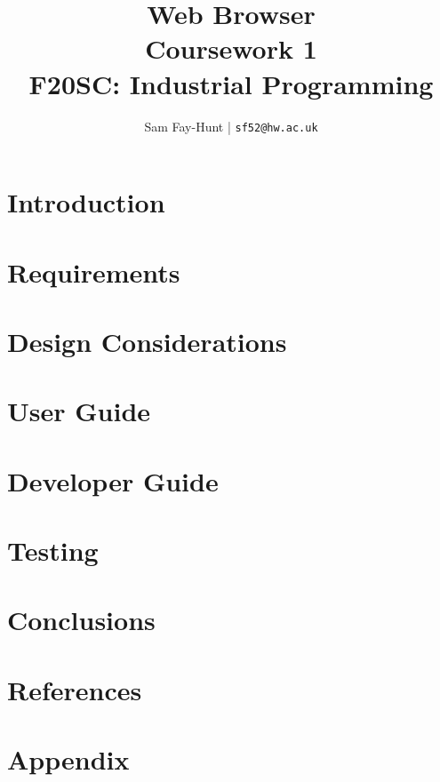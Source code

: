\documentclass[11pt]{article}
\begin{document}
\title{%
	\bf Web Browser\\ 
	\large Coursework 1 \\
	F20SC: Industrial Programming}

\author{
	Sam Fay-Hunt | \texttt{sf52@hw.ac.uk}
}

\maketitle
\thispagestyle{empty}
\pagebreak


\tableofcontents
\thispagestyle{empty}
\pagebreak


\setcounter{page}{1}

\section{Introduction}


\section{Requirements}


\section{Design Considerations}



\section{User Guide}


\section{Developer Guide}


\section{Testing}


\section{Conclusions}


\section{References}
\printbibliography

\appendix
\section{Appendix}

\end{document}
